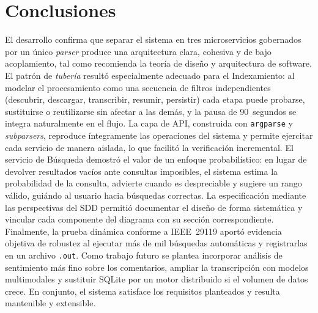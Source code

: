 \documentclass[11pt]{article}
\begin{document}
\section{Conclusiones}\label{sec:conclusiones}
El desarrollo confirma que separar el sistema en tres microservicios
gobernados por un \'unico \emph{parser} produce una arquitectura clara,
cohesiva y de bajo acoplamiento, tal como recomienda la teor\'ia de dise\~no y
arquitectura de software. El patr\'on de \emph{tuber\'ia} result\'o
especialmente adecuado para el Indexamiento: al modelar el procesamiento como
una secuencia de filtros independientes (descubrir, descargar, transcribir,
resumir, persistir) cada etapa puede probarse, sustituirse o reutilizarse sin
afectar a las dem\'as, y la pausa de 90~segundos se integra naturalmente en el
flujo. La capa de \ac{API}, construida con \texttt{argparse} y \emph{subparsers},
reproduce \'integramente las operaciones del sistema y permite ejercitar cada
servicio de manera aislada, lo que facilit\'o la verificaci\'on incremental. El
servicio de B\'usqueda demostr\'o el valor de un enfoque probabil\'istico: en
lugar de devolver resultados vac\'ios ante consultas imposibles, el sistema
estima la probabilidad de la consulta, advierte cuando es despreciable y sugiere
un rango v\'alido, gui\'ando al usuario hacia b\'usquedas correctas. La
especificaci\'on mediante las perspectivas del \ac{SDD} permiti\'o documentar el
dise\~no de forma sistem\'atica y vincular cada componente del diagrama con su
secci\'on correspondiente. Finalmente, la prueba din\'amica conforme a
IEEE~29119 aport\'o evidencia objetiva de robustez al ejecutar m\'as de mil
b\'usquedas autom\'aticas y registrarlas en un archivo \texttt{.out}. Como
trabajo futuro se plantea incorporar an\'alisis de sentimiento m\'as fino sobre
los comentarios, ampliar la transcripci\'on con modelos multimodales y
sustituir SQLite por un motor distribuido si el volumen de datos crece. En
conjunto, el sistema satisface los requisitos planteados y resulta mantenible y
extensible.

\end{document}
